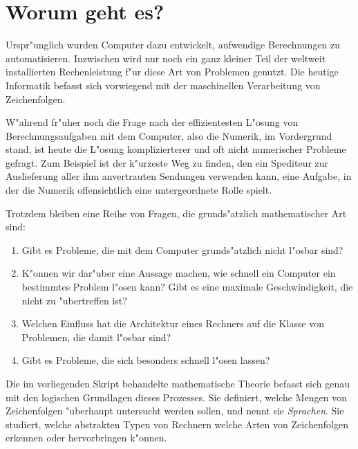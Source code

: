 %
%
%
\rhead{}
\chapter*{Worum geht es?\label{chapter-intro}}
Urspr"unglich wurden Computer dazu entwickelt, aufwendige
Berechnungen zu automatisieren. Inzwischen wird nur noch ein
ganz kleiner Teil der weltweit installierten Rechenleistung f"ur
diese Art von Problemen genutzt. 
Die heutige Informatik befasst sich vorwiegend mit der maschinellen
Verarbeitung von Zeichenfolgen. 

W"ahrend fr"uher noch die Frage nach der effizientesten L"osung von
Berechnungsaufgaben mit dem Computer, also die Numerik, im Vordergrund stand,  
ist heute die L"osung komplizierterer und oft nicht numerischer Probleme 
gefragt. Zum Beispiel ist der k"urzeste Weg zu finden, den ein Spediteur
zur Auslieferung aller ihm anvertrauten Sendungen verwenden kann, eine
Aufgabe, in der die Numerik offensichtlich eine untergeordnete Rolle spielt.

Trotzdem bleiben eine Reihe von Fragen, die grunds"atzlich mathematischer
Art sind:
\begin{enumerate}
\item Gibt es Probleme, die mit dem Computer grunds"atzlich nicht
l"osbar sind?
\item K"onnen wir dar"uber eine Aussage machen, wie schnell ein Computer
ein bestimmtes Problem l"osen kann? Gibt es eine maximale Geschwindigkeit,
die nicht zu "ubertreffen ist?
\item Welchen Einfluss hat die Architektur eines Rechners auf die Klasse
von Problemen, die damit l"osbar sind?
\item Gibt es Probleme, die sich besonders schnell l"osen lassen?
\end{enumerate}
Die im vorliegenden Skript behandelte mathematische Theorie befasst sich
genau mit den logischen Grundlagen dieses Prozesses.
Sie definiert, welche Mengen von Zeichenfolgen "uberhaupt untersucht
werden sollen, und nennt sie {\em Sprachen}.
Sie studiert, welche abstrakten Typen von
Rechnern welche Arten von Zeichenfolgen erkennen oder hervorbringen
k"onnen. 

